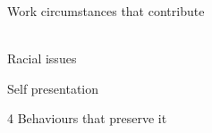\documentclass[aspectratio=169]{beamer}
\begin{document}
\begin{frame}
  \begin{center}
    \Huge Work circumstances that contribute
    \\ \small \cite{hh15}
    \\ \small \cite{clark14}
  \end{center}
\end{frame}

\begin{frame}
  \begin{center}
    \Huge Racial issues
    \\ \small \cite{colour}
  \end{center}
\end{frame}

\begin{frame}
  \begin{center}
    \Huge Self presentation
    \\ \small \cite{sakulku11}
  \end{center}
\end{frame}

\begin{frame}
  \begin{center}
    \Huge 4 Behaviours that preserve it
  \end{center}
\end{frame}
\end{document}
